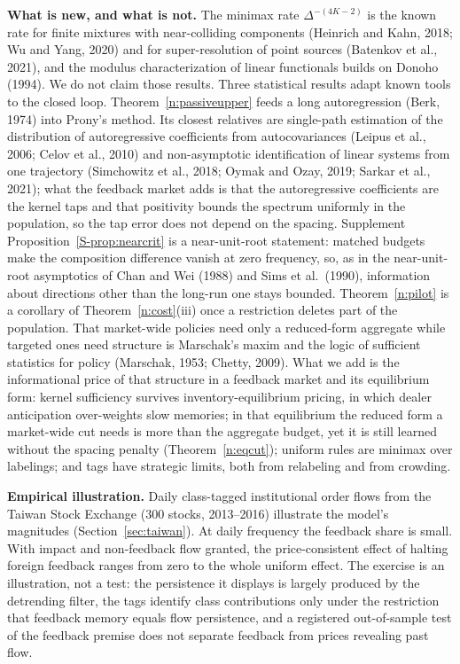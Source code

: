 \documentclass[11pt,letterpaper]{article}
\theoremstyle{definition}
\begin{document}
\textbf{What is new, and what is not.} The minimax rate $\Delta^{-(4K-2)}$ is the known rate for finite mixtures with near-colliding components (Heinrich and Kahn, 2018; Wu and Yang, 2020) and for super-resolution of point sources (Batenkov et al., 2021), and the modulus characterization of linear functionals builds on Donoho (1994). We do not claim those results. Three statistical results adapt known tools to the closed loop. Theorem~\ref{n:passiveupper} feeds a long autoregression (Berk, 1974) into Prony's method. Its closest relatives are single-path estimation of the distribution of autoregressive coefficients from autocovariances (Leipus et al., 2006; Celov et al., 2010) and non-asymptotic identification of linear systems from one trajectory (Simchowitz et al., 2018; Oymak and Ozay, 2019; Sarkar et al., 2021); what the feedback market adds is that the autoregressive coefficients are the kernel taps and that positivity bounds the spectrum uniformly in the population, so the tap error does not depend on the spacing. Supplement Proposition~\ref{S-prop:nearcrit} is a near-unit-root statement: matched budgets make the composition difference vanish at zero frequency, so, as in the near-unit-root asymptotics of Chan and Wei (1988) and Sims et al.\ (1990), information about directions other than the long-run one stays bounded. Theorem~\ref{n:pilot} is a corollary of Theorem~\ref{n:cost}(iii) once a restriction deletes part of the population. That market-wide policies need only a reduced-form aggregate while targeted ones need structure is Marschak's maxim and the logic of sufficient statistics for policy (Marschak, 1953; Chetty, 2009). What we add is the informational price of that structure in a feedback market and its equilibrium form: kernel sufficiency survives inventory-equilibrium pricing, in which dealer anticipation over-weights slow memories; in that equilibrium the reduced form a market-wide cut needs is more than the aggregate budget, yet it is still learned without the spacing penalty (Theorem~\ref{n:eqcut}); uniform rules are minimax over labelings; and tags have strategic limits, both from relabeling and from crowding.

\textbf{Empirical illustration.} Daily class-tagged institutional order flows from the Taiwan Stock Exchange (300 stocks, 2013--2016) illustrate the model's magnitudes (Section~\ref{sec:taiwan}). At daily frequency the feedback share is small. With impact and non-feedback flow granted, the price-consistent effect of halting foreign feedback ranges from zero to the whole uniform effect. The exercise is an illustration, not a test: the persistence it displays is largely produced by the detrending filter, the tags identify class contributions only under the restriction that feedback memory equals flow persistence, and a registered out-of-sample test of the feedback premise does not separate feedback from prices revealing past flow.
\end{document}
